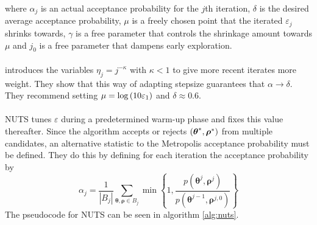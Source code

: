where $\alpha_j$ is an actual acceptance probability for the $j$th iteration, $\delta$ is the desired average acceptance probability, $\mu$ is a freely chosen point that the iterated $\varepsilon_j$ shrinks towards, $\gamma$ is a free parameter that controls the shrinkage amount towards $\mu$ and $j_0$ is a free parameter that dampens early exploration. 
\\
\\
\cite{hoffman2011nouturn} introduces the variables $\eta_j = j^{-\kappa}$ with $\kappa < 1$ to give more recent iterates more weight. They show that this way of adapting stepsize guarantees that $\alpha \rightarrow \delta$. They recommend setting $\mu = \log \left (10 \varepsilon_1\right)$ and $\delta \approx 0.6$.
\\
\\
NUTS tunes $\varepsilon$ during a predetermined warm-up phase and fixes this value thereafter. Since the algorithm accepts or rejects $\left (\boldsymbol{\theta}^*, \boldsymbol{\rho}^*\right)$ from multiple candidates, an alternative statistic to the Metropolis acceptance probability must be defined. They do this by defining for each iteration the acceptance probability by
\begin{equation*}
    \alpha_{j}=\frac{1}{\left|B_{j}\right|} \sum_{\boldsymbol{\theta}, \boldsymbol{\rho} \in B_{j}} \min \left\{1, \frac{p\left(\boldsymbol{\theta}^{j}, \boldsymbol{\rho}^{j}\right)}{p\left(\boldsymbol{\theta}^{j-1}, \boldsymbol{\rho}^{j, 0}\right)}\right\}
\end{equation*}
The pseudocode for NUTS can be seen in algorithm \ref{alg:nuts}.

